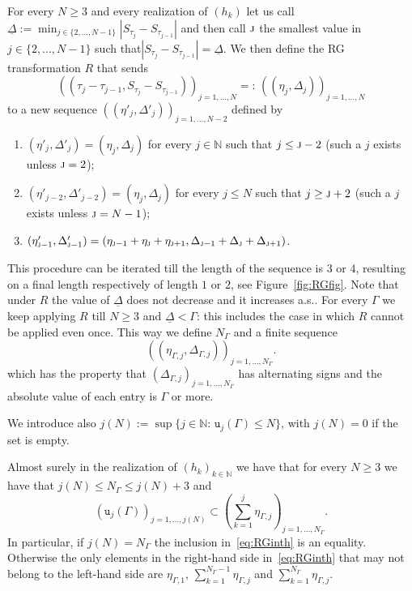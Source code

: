 \documentclass[10pt]{amsart}
\theoremstyle{definition}\newtheorem{defi}[theo]{Definition}\newtheorem{rema}[theo]{Remark}\newtheorem{exam}[theo]{Example}\newtheorem{exem}[theo]{Example}\newtheorem{nota}[theo]{Notation}
\newcommand{\bbN}{\mathbb{N}}
\newcommand{\gG}{\Gamma}
\newcommand{\gD}{\Delta}
\renewcommand*\ss{\mathtt{u}}
\newcommand{\tu}{\ss}
\begin{document}
For every $N\ge 3$ and every realization of $(h_k)$ let us call $\underline{\gD}:= \min_{j\in\{2, \dots, N-1\}}| S_{\tau_{j}}-S_{\tau_{j-1}}|$ and then call $\textsc{j}$ the smallest value in $j\in \{2, \dots, N-1\}$ such that\linebreak ${| S_{\tau_{j}}-S_{\tau_{j-1}}|=\underline{\gD}}$. We then define the RG transformation $R$ that sends
\begin{equation}
\left(\left(\tau_{j}-\tau_{j-1}, S_{\tau_{j}}-S_{\tau_{j-1}}\right)\right)_{j=1, \dots, N}=: \,
\left(\left(\eta_j, \gD_j \right)\right)_{j=1, \dots, N}
\end{equation}
to a new sequence $((\eta'_j, \gD'_j))_{j=1, \dots, N-2}$ defined by
\begin{enumerate}
\item $ (\eta'_j, \gD'_j)= (\eta_j, \gD_j)$ for every $j\in \bbN$ such that $ j \le \textsc{j}-2$ (such a $j$ exists unless $\textsc{j}=2$);
\item $ (\eta'_{j-2}, \gD'_{j-2})= (\eta_j, \gD_j)$ for every $j\le N$ such that $ j \ge \textsc{j}+2$ (such a $j$ exists unless $\textsc{j}=N-1$);
\item $ (\eta'_{\textsc{j}-1}, \gD'_{\textsc{j}-1})= (\eta_{\textsc{j}-1}+ \eta_{\textsc{j}}+ \eta_{\textsc{j}+1}, \gD_{\textsc{j}-1}+ \gD_{\textsc{j}}+ \gD_{\textsc{j}+1})$.
\end{enumerate}

This procedure can be iterated till the length of the sequence is $3$ or $4$, resulting on a final length respectively of length $1$ or $2$, see Figure~\ref{fig:RGfig}. Note that under $R$ the value of $\underline{\gD}$ does not decrease and it increases a.s.. For every $\gG$ we keep applying $R$ till $N\ge 3$ and $\underline{\gD}< \gG$: this includes the case in which $R$ cannot be applied even once. This way we define $N_\gG$ and a finite sequence
\begin{equation}\label{eq:alt-signs-Gamma}
\left(\left(\eta_{\gG,j}, \gD_{\gG,j}\right)\right)_{j=1, \dots,N_\gG }.
\end{equation}
which has the property that $\left(\gD_{\gG,j}\right)_{j=1, \dots,N_\gG }$ has alternating signs and the absolute value of each entry is $\gG$ or more.

We introduce also $j(N):= \sup\{j\in \bbN: \, \tu_j(\gG) \le N\}$, with $j(N)=0$ if the set is empty.


\begin{prop}\label{th:RG}
Almost surely in the realization of $(h_k)_{k\in \bbN}$ we have that for every $N\ge 3$ we have that $j(N) \le N_\gG \le j(N)+3$ and
\begin{equation}\label{eq:RGinth}
\left(\tu_j(\gG)\right)_{j=1, \dots,j(N)} \subset \left(\sum_{k=1}^j \eta_{\gG,j} \right)_{j=1,\dots, N_\gG}.
\end{equation}
In particular, if $j(N)=N_\gG$ the inclusion in~\eqref{eq:RGinth} is an equality. Otherwise the only elements in the right-hand side in~\eqref{eq:RGinth} that may not belong to the left-hand side are $ \eta_{\gG,1}$, $\sum_{k=1}^{N_\gG-1} \eta_{\gG,j}$ and $\sum_{k=1}^{N_\gG} \eta_{\gG,j}$.
\end{prop}
\end{document}
